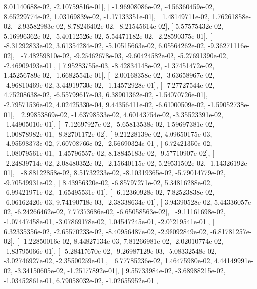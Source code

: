 \documentclass{article}
\begin{document}
          8.01140688e-02,  -2.10759816e-01],
       [ -1.96908086e-02,  -4.56360459e-02,   8.65229774e-02,
          1.03169839e-02,  -1.17133351e-01],
       [  1.48149711e-02,   1.76261858e-02,  -2.93582983e-02,
          8.78246402e-02,  -8.21545614e-02],
       [  5.57575432e-02,   5.16996362e-02,  -5.40112526e-02,
          5.54471182e-02,  -2.28590375e-01],
       [ -8.31292833e-02,   3.61354284e-02,  -5.10515663e-02,
          6.05564262e-02,  -9.36271116e-02],
       [ -7.48259810e-02,  -9.25462678e-03,  -9.60424582e-02,
         -5.27691390e-02,  -2.46909493e-01],
       [  7.95283755e-03,  -8.42834148e-02,  -1.37451472e-02,
          1.45256789e-02,  -1.66825541e-01],
       [ -2.00168358e-02,  -3.63658967e-02,  -4.96810469e-02,
          3.44919730e-02,  -1.14572928e-01],
       [ -7.27727544e-02,   4.75208638e-02,  -6.55799617e-03,
          6.38901362e-02,  -1.54070726e-01],
       [ -2.79571536e-02,   4.02425330e-04,   9.44356411e-02,
         -6.61000509e-02,  -1.59052738e-01],
       [  2.99853869e-02,  -1.63798533e-02,   4.60143754e-02,
         -3.35523391e-02,  -1.44905010e-01],
       [ -7.12697927e-02,  -5.65813538e-02,   1.59697381e-02,
         -1.00878982e-01,  -8.82701172e-02],
       [  9.21228139e-02,   4.09650175e-03,  -4.95598373e-02,
          7.60708766e-02,  -2.56690324e-01],
       [  6.72421350e-02,  -1.08079561e-01,  -1.45796557e-02,
          8.18845183e-02,  -9.57710907e-02],
       [ -2.24839714e-02,   2.08480352e-02,  -2.15640115e-02,
          5.29531502e-02,  -1.14326192e-01],
       [ -8.88122858e-02,   8.51732233e-02,  -8.10319365e-02,
         -5.79014779e-02,  -9.70549931e-02],
       [  8.43956320e-02,  -6.85797271e-02,   5.34816288e-02,
         -6.99421971e-02,  -1.65495531e-01],
       [ -6.12360928e-02,   7.82523838e-02,  -6.06162420e-03,
          9.74190718e-03,  -2.38338634e-01],
       [  3.94390528e-02,   5.44336057e-02,  -6.24266462e-02,
          7.77373686e-02,  -6.65058563e-02],
       [ -9.11161698e-02,  -1.07447458e-01,  -3.07869178e-02,
          1.04547245e-01,  -2.07219541e-01],
       [  6.32335356e-02,  -2.65570233e-02,  -8.40956487e-02,
         -2.98092849e-02,  -6.81781257e-02],
       [ -1.22850016e-02,   8.44827134e-03,   7.81266981e-02,
         -2.02010774e-02,  -1.83795066e-01],
       [ -5.28417670e-02,  -9.26987129e-03,  -5.08332548e-02,
         -3.02746927e-02,  -2.35500259e-01],
       [  6.77785236e-02,   1.46475980e-02,   4.44149991e-02,
         -3.34150605e-02,  -1.25177892e-01],
       [  9.55733984e-02,  -3.68988215e-02,  -1.03452861e-01,
          6.79058032e-02,  -1.02655952e-01],
\end{document}
